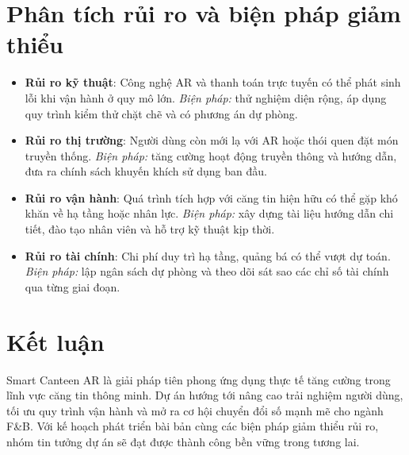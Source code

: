 \documentclass[12pt,a4paper]{article}
\begin{document}
\section{Phân tích rủi ro và biện pháp giảm thiểu}
\begin{riskbox}
\begin{itemize}
    \item \textbf{Rủi ro kỹ thuật}: Công nghệ AR và thanh toán trực tuyến có thể
    phát sinh lỗi khi vận hành ở quy mô lớn. \textit{Biện pháp:} thử nghiệm diện
    rộng, áp dụng quy trình kiểm thử chặt chẽ và có phương án dự phòng.
    \item \textbf{Rủi ro thị trường}: Người dùng còn mới lạ với AR hoặc thói quen
    đặt món truyền thống. \textit{Biện pháp:} tăng cường hoạt động truyền thông
    và hướng dẫn, đưa ra chính sách khuyến khích sử dụng ban đầu.
    \item \textbf{Rủi ro vận hành}: Quá trình tích hợp với căng tin hiện hữu có thể
    gặp khó khăn về hạ tầng hoặc nhân lực. \textit{Biện pháp:} xây dựng tài liệu
    hướng dẫn chi tiết, đào tạo nhân viên và hỗ trợ kỹ thuật kịp thời.
    \item \textbf{Rủi ro tài chính}: Chi phí duy trì hạ tầng, quảng bá có thể vượt
    dự toán. \textit{Biện pháp:} lập ngân sách dự phòng và theo dõi sát sao các
    chỉ số tài chính qua từng giai đoạn.
\end{itemize}
\end{riskbox}

\section{Kết luận}
Smart Canteen AR là giải pháp tiên phong ứng dụng thực tế tăng cường trong lĩnh
vực căng tin thông minh. Dự án hướng tới nâng cao trải nghiệm người dùng, tối ưu
quy trình vận hành và mở ra cơ hội chuyển đổi số mạnh mẽ cho ngành F\&B. Với kế
hoạch phát triển bài bản cùng các biện pháp giảm thiểu rủi ro, nhóm tin tưởng dự
án sẽ đạt được thành công bền vững trong tương lai.

\clearpage %
\end{document}
